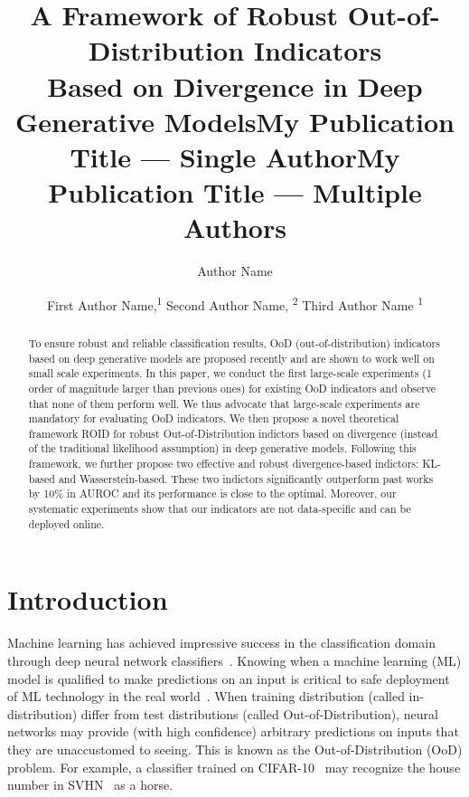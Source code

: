 \documentclass[letterpaper]{article} %
\title{A Framework of Robust Out-of-Distribution Indicators \\ Based on Divergence in Deep Generative Models}
\author{
}
\title{My Publication Title --- Single Author}
\author {
    Author Name \\
}
\title{My Publication Title --- Multiple Authors}
\author {

        First Author Name,\textsuperscript{\rm 1}
        Second Author Name, \textsuperscript{\rm 2}
        Third Author Name \textsuperscript{\rm 1} \\
}
\begin{document}
\linenumbers  %

\maketitle

\begin{abstract}

To ensure robust and reliable classification results, OoD (out-of-distribution) indicators based on deep generative models are proposed recently and are shown to work well on small scale experiments. In this paper, we conduct the first large-scale experiments (1 order of magnitude larger than previous ones) for existing OoD indicators and observe that none of them perform well. We thus advocate that large-scale experiments are mandatory for evaluating OoD indicators. We then propose a novel theoretical framework ROID for robust Out-of-Distribution indictors based on divergence (instead of the traditional likelihood assumption) in deep generative models. Following  this framework, we further propose two effective and robust divergence-based indictors: KL-based and Wasserstein-based. These two indictors significantly outperform past works by 10\% in AUROC and its performance is close to the optimal. Moreover, our systematic experiments show that our indicators are not data-specific and can be deployed online. 

 
\end{abstract}

\section{Introduction}
Machine learning has achieved impressive success in the classification domain through deep neural network classifiers~\cite{szegedy2016inception,he2016deep,zagoruyko2016wide}. Knowing when a machine learning (ML) model is qualified to make predictions on an input is critical to safe deployment of ML technology in the real world~\cite{choi2018waic}. When training distribution (called in-distribution) differ from test distributions (called Out-of-Distribution), neural networks may provide (with high confidence) arbitrary predictions on inputs that they are unaccustomed to seeing. This is known as the Out-of-Distribution (OoD) problem\cite{choi2018waic}.
%
For example, a classifier trained on CIFAR-10~\cite{krizhevsky2009learning} may recognize the house number in SVHN~\cite{netzer2011reading} as a horse. 
\end{document}
